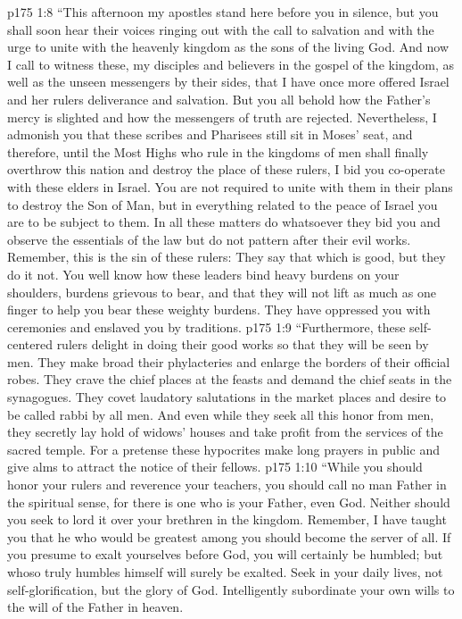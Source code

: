 \vs p175 1:8 \textcolor{ubdarkred}{“This afternoon my apostles stand here before you in silence, but you shall soon hear their voices ringing out with the call to salvation and with the urge to unite with the heavenly kingdom as the sons of the living God. And now I call to witness these, my disciples and believers in the gospel of the kingdom, as well as the unseen messengers by their sides, that I have once more offered Israel and her rulers deliverance and salvation. But you all behold how the Father’s mercy is slighted and how the messengers of truth are rejected. Nevertheless, I admonish you that these scribes and Pharisees still sit in Moses’ seat, and therefore, until the Most Highs who rule in the kingdoms of men shall finally overthrow this nation and destroy the place of these rulers, I bid you co\hyp{}operate with these elders in Israel. You are not required to unite with them in their plans to destroy the Son of Man, but in everything related to the peace of Israel you are to be subject to them. In all these matters do whatsoever they bid you and observe the essentials of the law but do not pattern after their evil works. Remember, this is the sin of these rulers: They say that which is good, but they do it not. You well know how these leaders bind heavy burdens on your shoulders, burdens grievous to bear, and that they will not lift as much as one finger to help you bear these weighty burdens. They have oppressed you with ceremonies and enslaved you by traditions.}
\vs p175 1:9 \textcolor{ubdarkred}{“Furthermore, these self\hyp{}centered rulers delight in doing their good works so that they will be seen by men. They make broad their phylacteries and enlarge the borders of their official robes. They crave the chief places at the feasts and demand the chief seats in the synagogues. They covet laudatory salutations in the market places and desire to be called rabbi by all men. And even while they seek all this honor from men, they secretly lay hold of widows’ houses and take profit from the services of the sacred temple. For a pretense these hypocrites make long prayers in public and give alms to attract the notice of their fellows.}
\vs p175 1:10 \textcolor{ubdarkred}{“While you should honor your rulers and reverence your teachers, you should call no man Father in the spiritual sense, for there is one who is your Father, even God. Neither should you seek to lord it over your brethren in the kingdom. Remember, I have taught you that he who would be greatest among you should become the server of all. If you presume to exalt yourselves before God, you will certainly be humbled; but whoso truly humbles himself will surely be exalted. Seek in your daily lives, not self\hyp{}glorification, but the glory of God. Intelligently subordinate your own wills to the will of the Father in heaven.}

